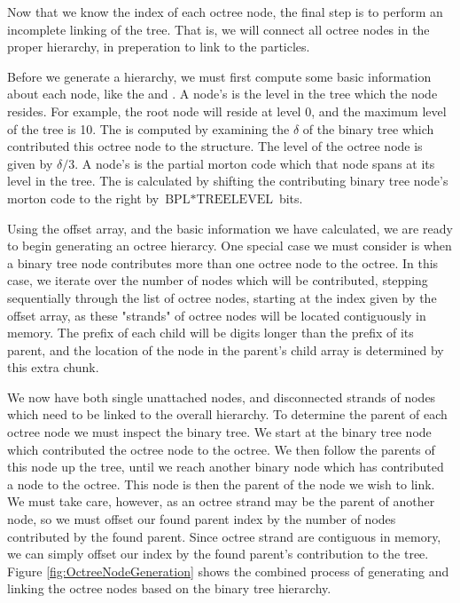 \documentclass{thesis}
\begin{document}
Now that we know the index of each octree node, the final step is to perform an incomplete linking of the tree. That is, we will connect all octree nodes in the proper hierarchy, in preperation to link to the particles.

Before we generate a hierarchy, we must first compute some basic information about each node, like the  and . A node's  is the level in the tree which the node resides. For example, the root node will reside at level 0, and the maximum level of the tree is 10. The  is computed by examining the $\delta$ of the binary tree which contributed this octree node to the structure. The level of the octree node is given by $\delta/3$. A node's  is the partial morton code which that node spans at its level in the tree. The  is calculated by shifting the contributing binary tree node's morton code to the right by $\text{BPL} * \text{TREELEVEL}$ bits.  

Using the offset array, and the basic information we have calculated, we are ready to begin generating an octree hierarcy. One special case we must consider is when a binary tree node contributes more than one octree node to the octree. In this case, we iterate over the number of nodes which will be contributed, stepping sequentially through the list of octree nodes, starting at the index given by the offset array, as these "strands" of octree nodes will be located contiguously in memory. The prefix of each child will be  digits longer than the prefix of its parent, and the location of the node in the parent's child array is determined by this extra chunk.

We now have both single unattached nodes, and disconnected strands of nodes which need to be linked to the overall hierarchy. To determine the parent of each octree node we must inspect the binary tree. We start at the binary tree node which contributed the octree node to the octree. We then follow the parents of this node up the tree, until we reach another binary node which has contributed a node to the octree. This node is then the parent of the node we wish to link. We must take care, however, as an octree strand may be the parent of another node, so we must offset our found parent index by the number of nodes contributed by the found parent. Since octree strand are contiguous in memory, we can simply offset our index by the found parent's contribution to the tree. Figure \ref{fig:OctreeNodeGeneration} shows the combined process of generating and linking the octree nodes based on the binary tree hierarchy.
\end{document}
